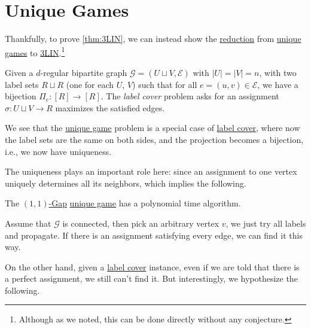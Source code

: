 \section{Unique Games}
Thankfully, to prove \autoref{thm:3LIN}, we can instead show the \hyperref[def:reduction]{reduction} from \hyperref[prb:unique-game]{unique games} to \hyperref[prb:max-3LIN]{3LIN}.\footnote{Although as we noted, this can be done directly without any conjecture.}

\begin{problem}\label{prb:unique-game}
Given a \(d\)-regular bipartite graph \(\mathcal{G} =(U\sqcup V , \mathcal{E} )\) with \(\vert U \vert = \vert V \vert = n\), with two label sets \(R \sqcup R\) (one for each \(U\), \(V \)) such that for all \(e=(u, v)\in \mathcal{E} \), we have a bijection \(\Pi _e \colon [R]\to [R]\). The \emph{label cover} problem asks for an assignment \(\sigma\colon U \sqcup V \to R\) maximizes the satisfied edges.
\end{problem}

\begin{remark}
	We see that the \hyperref[prb:unique-game]{unique game} problem is a special case of \hyperref[prb:label-cover]{label cover}, where now the label sets are the same on both sides, and the projection becomes a bijection, i.e., we now have uniqueness.
\end{remark}

\begin{center}
\end{center}

The uniqueness plays an important role here: since an assignment to one vertex uniquely determines all its neighbors, which implies the following.
\begin{claim}
	The \hyperref[def:c-s-Gap]{\((1, 1)\)-Gap} \hyperref[prb:unique-game]{unique game} has a polynomial time algorithm.
\end{claim}
\begin{explanation}
	Assume that \(\mathcal{G} \) is connected, then pick an arbitrary vertex \(v\), we just try all labels and propagate. If there is an assignment satisfying every edge, we can find it this way.
\end{explanation}

On the other hand, given a \hyperref[prb:label-cover]{label cover} instance, even if we are told that there is a perfect assignment, we still can't find it. But interestingly, we hypothesize the following.

